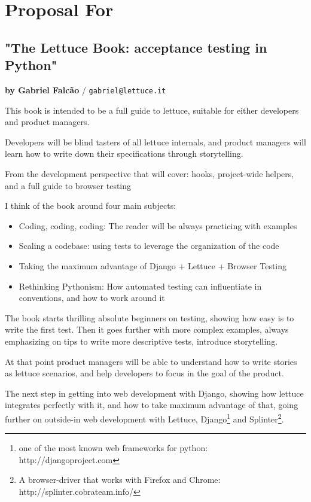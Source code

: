 \documentclass[letterpaper]{article}
\begin{document}
\section*{Proposal For}

\subsection*{"The Lettuce Book: acceptance testing in Python"}
\normalsize\textbf{by Gabriel Falcão} \large{/} \texttt{gabriel@lettuce.it}

\normalsize

This book is intended to be a full guide to lettuce, suitable for
either developers and product managers.

\noindent
Developers will be blind tasters of all lettuce internals, and product
managers will learn how to write down their specifications through
storytelling.

\noindent
From the development perspective that will cover: hooks, project-wide
helpers, and a full guide to browser testing

\noindent
I think of the book around four main subjects:

\begin{itemize}

\item{Coding, coding, coding: The reader will be always practicing with examples}

\item{Scaling a codebase: using tests to leverage the organization of the code}

\item{Taking the maximum advantage of Django + Lettuce + Browser Testing}

\item{Rethinking Pythonism: How automated testing can influentiate in conventions, and how to work around it}
\end{itemize}

\noindent

The book starts thrilling absolute beginners on testing, showing how easy is to write the first test.
Then it goes further with more complex examples, always emphasizing on
tips to write more descriptive tests, introduce storytelling.

\noindent
At that point product managers will be able to understand how to write
stories as lettuce scenarios, and help developers to focus in the goal
of the product.

\noindent
The next step in getting into web development with Django, showing how
lettuce integrates perfectly with it, and how to take maximum
advantage of that, going further on outside-in web development with
Lettuce, Django\footnote{one of the most known web frameworks for python: http://djangoproject.com} and Splinter\footnote{A browser-driver that works with Firefox and Chrome: http://splinter.cobrateam.info/}.
\end{document}
